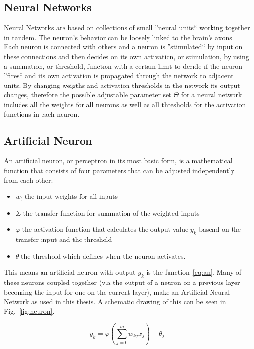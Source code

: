 \subsection{Neural Networks}
\label{sec:fund:general}
Neural Networks are based on collections of small ''neural units``  working together in tandem. The neuron's behavior can be loosely linked to the brain's axons. Each neuron is connected with others and a neuron is ''stimulated`` by input on these connections and then decides on its own activation, or stimulation, by using a summation, or threshold, function with a certain limit to decide if the neuron ''fires`` and its own activation is propagated through the network to adjacent units. By changing weigths and activation thresholds in the network its output changes, therefore the possible adjustable parameter set \(\Theta\) for a neural network includes all the weights for all neurons as well as all thresholds for the activation functions in each neuron.

\subsection{Artificial Neuron}
\label{sec:fund:AN}

An artificial neuron, or perceptron in its most basic form, is a mathematical function that consists of four parameters that can be adjusted independently from each other:
\begin{itemize}
\item \(w_i\) the input weights for all inputs
\item \(\Sigma\) the transfer function for summation of the weighted inputs
\item \(\varphi\) the activation function that calculates the output value \(y_k\) basend on the transfer input and the threshold
\item \(\theta\) the threshold which defines when the neuron activates.
\end{itemize}

This means an artificial neuron with output \(y_k\) is the function~\ref{eq:an}. Many of these neurons coupled together (via the output of a neuron on a previous layer becoming the input for one on the current layer), make an Artificial Neural Network as used in this thesis. A schematic drawing of this can be seen in Fig.~\ref{fig:neuron}.

\begin{equation}
y_k = \varphi(\sum_{j=0}^{m} w_{kj}x_j) - \theta_j
\label{eq:an}
\end{equation}


